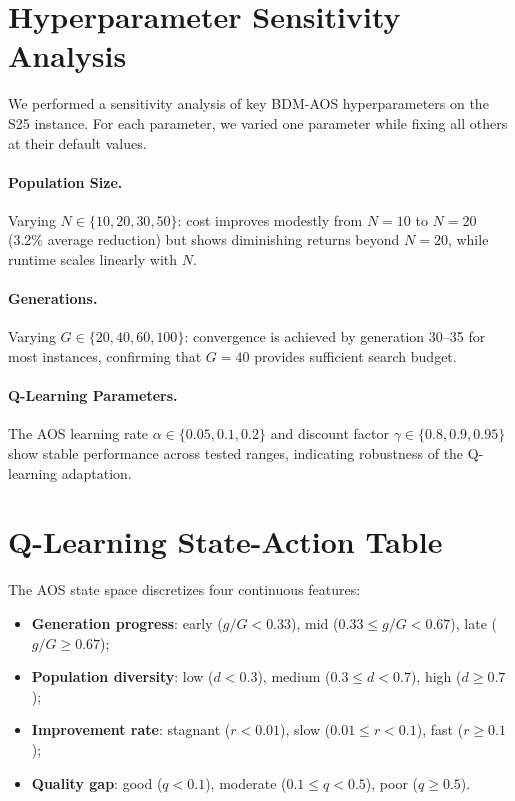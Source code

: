 \section{Hyperparameter Sensitivity Analysis}
\label{app:sensitivity}

We performed a sensitivity analysis of key BDM-AOS hyperparameters on the S25 instance.
For each parameter, we varied one parameter while fixing all others at their default values.

\paragraph{Population Size.}
Varying $N \in \{10, 20, 30, 50\}$: cost improves modestly from $N=10$ to $N=20$ (3.2\% average reduction) but shows diminishing returns beyond $N=20$, while runtime scales linearly with $N$.

\paragraph{Generations.}
Varying $G \in \{20, 40, 60, 100\}$: convergence is achieved by generation 30--35 for most instances, confirming that $G=40$ provides sufficient search budget.

\paragraph{Q-Learning Parameters.}
The AOS learning rate $\alpha \in \{0.05, 0.1, 0.2\}$ and discount factor $\gamma \in \{0.8, 0.9, 0.95\}$ show stable performance across tested ranges, indicating robustness of the Q-learning adaptation.

\section{Q-Learning State-Action Table}
\label{app:qtable}

The AOS state space discretizes four continuous features:
\begin{itemize}
    \item \textbf{Generation progress}: early ($g/G < 0.33$), mid ($0.33 \leq g/G < 0.67$), late ($g/G \geq 0.67$);
    \item \textbf{Population diversity}: low ($d < 0.3$), medium ($0.3 \leq d < 0.7$), high ($d \geq 0.7$);
    \item \textbf{Improvement rate}: stagnant ($r < 0.01$), slow ($0.01 \leq r < 0.1$), fast ($r \geq 0.1$);
    \item \textbf{Quality gap}: good ($q < 0.1$), moderate ($0.1 \leq q < 0.5$), poor ($q \geq 0.5$).
\end{itemize}

